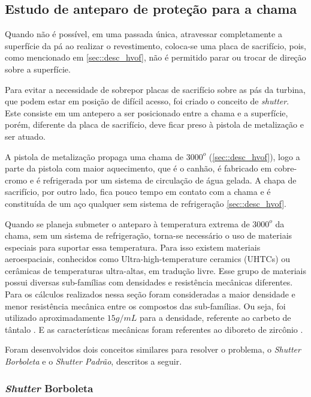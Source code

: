 \subsection{Estudo de anteparo de proteção para a chama}
Quando não é possível, em uma passada única, atraves\-sar completamente a
superfície da pá ao realizar o revestimento, coloca-se uma placa de sacrifício,
pois, como menciona\-do em \ref{sec::desc_hvof}, não é permitido parar ou trocar
de direção sobre a superfície.

Para evitar a necessidade de sobrepor placas de sacrifício sobre as pás da
turbina, que podem estar em posição de difícil acesso, foi criado o conceito de
\textit{shutter}. Este consiste em um antepero a ser posicionado entre a chama e
a superfície, porém, diferente da placa de sacrifício, deve ficar preso à
pistola de metalização e ser atuado.

A pistola de metalização propaga uma chama de $3000^o$ (\ref{sec::desc_hvof}),
logo a parte da pistola com maior aquecimento, que é o canhão, é fabricado em
cobre-cromo e é refrigerada por um sistema de circulação de água
gelada. A chapa de sacrifício, por outro lado, fica pouco tempo em contato com
a chama e é constituída de um aço qualquer sem sistema de refrigeração
\ref{sec::desc_hvof}.

Quando se planeja submeter o anteparo à temperatu\-ra extrema de $3000^o$ da
chama, sem um sistema de refrigeração, torna-se necessário o uso de materia\-is
especiais para suportar essa temperatura. Para isso existem materiais
aeroespaciais, conhecidos como Ultra-high-temperature ceramics (UHTCs) ou
cerâmi\-cas de temperaturas ultra-altas, em tradução livre. Esse grupo de
materiais possui diversas sub-famílias com densidades e resistência mecânicas
diferentes. Para os cálculos realizados nessa seção foram consideradas a maior
densidade e menor resistência mecânica entre os compostos das sub-famílias. Ou
seja, foi utilizado aproximadamente \textbf{$15 g/mL$} para a densidade, referente ao
carbeto de tântalo \citep{bansal2005ceramic}. E as características mecânicas
foram referentes ao diboreto de zircônio \citep{diborides}.

Foram desenvolvidos dois conceitos similares para resolver o problema, o \textit{Shutter
Borboleta} e o \textit{Shutter Padrão}, descritos a seguir.

\subsubsection{\textit{Shutter} Borboleta}
\label{borboleta}

